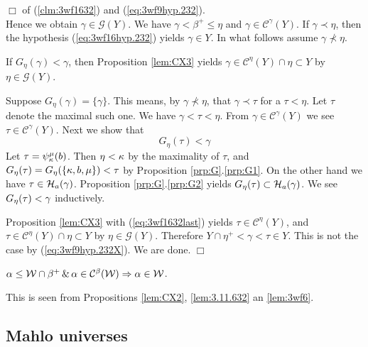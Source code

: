 \documentclass{article}
\begin{document}
\hspace*{\fill} $\Box$ of (\ref{clm:3wf1632}) and (\ref{eq:3wf9hyp.232}).
\\

\noindent
Hence we obtain $\gamma\in\mathcal{G}(Y)$.
We have $\gamma<\beta^{+}\leq\eta$ and 
$\gamma\in\mathcal{C}^{\gamma}(Y)$.
If $\gamma\prec\eta$, then the hypothesis 
(\ref{eq:3wf16hyp.232}) yields $\gamma\in Y$.
In what follows assume $\gamma\not\prec\eta$.


If $G_{\eta}(\gamma)<\gamma$, then  Proposition \ref{lem:CX3} yields 
$\gamma\in\mathcal{C}^{\eta}(Y)\cap\eta\subset Y$ by $\eta\in\mathcal{G}(Y)$.

Suppose $G_{\eta}(\gamma)=\{\gamma\}$. 
This means, by $\gamma\not\prec\eta$, that
$\gamma\prec\tau$ for a $\tau<\eta$.
Let $\tau$ denote the maximal such one.
We have $\gamma<\tau<\eta$.
From $\gamma\in\mathcal{C}^{\gamma}(Y)$ we see 
$\tau\in\mathcal{C}^{\gamma}(Y)$.
Next we show that
\begin{equation}\label{eq:3wf1632last}
G_{\eta}(\tau)<\gamma
\end{equation}
Let $\tau=\psi_{\kappa}^{\mu}(b)$.
Then $\eta<\kappa$ by the maximality of $\tau$, and
$G_{\eta}(\tau)=G_{\eta}(\{\kappa,b,\mu\})<\tau$ by Proposition \ref{prp:G}.\ref{prp:G1}.
On the other hand we have $\tau\in\mathcal{H}_{a}(\gamma)$.
Proposition \ref{prp:G}.\ref{prp:G2} yields
$G_{\eta}(\tau)\subset\mathcal{H}_{a}(\gamma)$.
We see $G_{\eta}(\tau)<\gamma$ inductively.


Proposition \ref{lem:CX3} with (\ref{eq:3wf1632last}) yields 
$\tau\in\mathcal{C}^{\eta}(Y)$, and
$\tau\in\mathcal{C}^{\eta}(Y)\cap\eta\subset Y$ by $\eta\in\mathcal{G}(Y)$.
Therefore $Y\cap\eta^{+}<\gamma<\tau\in Y$.
This is not the case by (\ref{eq:3wf9hyp.232X}).
We are done.
\hspace*{\fill} $\Box$



\begin{proposition}\label{prp:updis}
$\alpha\leq \mathcal{W}\cap\beta^{+} \,\&\, \alpha\in\mathcal{C}^{\beta}(\mathcal{W}) \Rightarrow \alpha\in \mathcal{W}$.
\end{proposition}
\bprf
This is seen from Propositions \ref{lem:CX2}, \ref{lem:3.11.632} an \ref{lem:3wf6}.
\eprf





\subsection{Mahlo universes}
\end{document}
